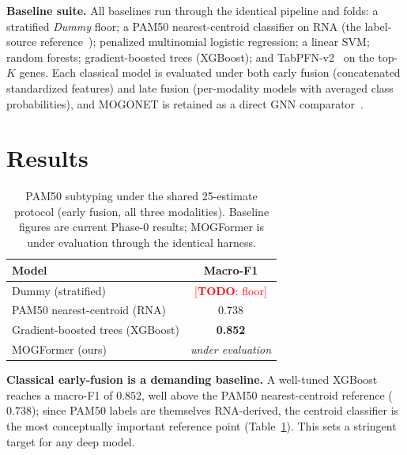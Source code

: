 \documentclass[10pt, twocolumn]{article}
\newcommand{\todo}[1]{\textcolor{red}{[\textbf{TODO}: #1]}}
\begin{document}
\vspace{0.15cm}\noindent\textbf{Baseline suite.}
All baselines run through the identical pipeline and folds: a stratified
\textit{Dummy} floor; a PAM50 nearest-centroid classifier on RNA (the
label-source reference~\cite{parker2009pam50}); penalized multinomial logistic
regression; a linear SVM; random forests; gradient-boosted trees (XGBoost); and
TabPFN-v2~\cite{hollmann2023tabpfn} on the top-$K$ genes. Each classical model is
evaluated under both early fusion (concatenated standardized features) and late
fusion (per-modality models with averaged class probabilities), and MOGONET is
retained as a direct GNN comparator~\cite{wang2021mogonet}.

\section{Results}
\label{sec:results}

\begin{table}[t]
    \centering
    \small
    \caption{PAM50 subtyping under the shared 25-estimate protocol (early fusion,
    all three modalities). Baseline figures are current Phase-0 results;
    MOGFormer is under evaluation through the identical harness.}
    \label{tab:baselines}
    \begin{tabular}{lc}
        \toprule
        Model & Macro-F1 \\
        \midrule
        Dummy (stratified) & \todo{floor} \\
        PAM50 nearest-centroid (RNA) & 0.738 \\
        Gradient-boosted trees (XGBoost) & \textbf{0.852} \\
        \midrule
        MOGFormer (ours) & \textit{under evaluation} \\
        \bottomrule
    \end{tabular}
\end{table}

\noindent\textbf{Classical early-fusion is a demanding baseline.} A well-tuned
XGBoost reaches a macro-F1 of $0.852$, well above the PAM50 nearest-centroid
reference ($0.738$); since PAM50 labels are themselves RNA-derived, the centroid
classifier is the most conceptually important reference point
(Table~\ref{tab:baselines}). This sets a stringent target for any deep model.
\end{document}

